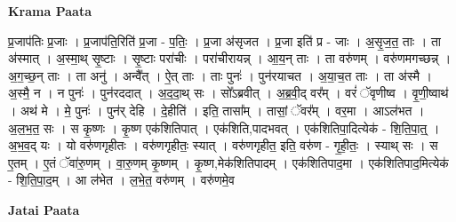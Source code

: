 \documentclass[17pt]{extarticle}
\begin{document}
\textbf{Krama Paata} \newline

प्र॒जाप॑तिः प्र॒जाः । प्र॒जाप॑ति॒रिति॑ प्र॒जा - प॒तिः॒ । प्र॒जा अ॑सृजत । प्र॒जा इति॑ प्र - जाः । अ॒सृ॒ज॒त॒ ताः । ता अ॑स्मात् । अ॒स्मा॒थ् सृ॒ष्टाः । सृ॒ष्टाः परा॑चीः । परा॑चीरायन्न् । आ॒य॒न् ताः । ता वरु॑णम् । वरु॑णमगच्छन्न् । अ॒ग॒च्छ॒न् ताः । ता अनु॑ । अन्वै᳚त् । ऐ॒त् ताः । ताः पुनः॑ । पुन॑रयाचत । अ॒या॒च॒त ताः । ता अ॑स्मै । अ॒स्मै॒ न । न पुनः॑ । पुन॑रददात् । अ॒द॒दा॒थ् सः । सो᳚ऽब्रवीत् । अ॒ब्र॒वी॒द् वर᳚म् । वरं॑ ॅवृणीष्व । वृ॒णी॒ष्वाथ॑ । अथ॑ मे । मे॒ पुनः॑ । पुन॑र् देहि । दे॒हीति॑ । इति॒ तासा᳚म् । तासां॒ ॅवर᳚म् । वर॒मा । आऽल॑भत । अ॒ल॒भ॒त॒ सः । स कृ॒ष्णः । कृ॒ष्ण एक॑शितिपात् । एक॑शिति,पादभवत् । एक॑शितिपा॒दित्येक॑ - शि॒ति॒पा॒त्॒ । अ॒भ॒व॒द् यः । यो वरु॑णगृहीतः । वरु॑णगृहीतः॒ स्यात् । वरु॑णगृहीत॒ इति॒ वरु॑ण - गृ॒ही॒तः॒ । स्याथ् सः । स ए॒तम् । ए॒तं ॅवा॑रु॒णम् । वा॒रु॒णम् कृ॒ष्णम् । कृ॒ष्ण,मेक॑शितिपादम् । एक॑शितिपाद॒मा । एक॑शितिपाद॒मित्येक॑ - शि॒ति॒पा॒द॒म् । आ ल॑भेत । ल॒भे॒त॒ वरु॑णम् । वरु॑णमे॒व \newline

\textbf{Jatai Paata} \newline
\end{document}
